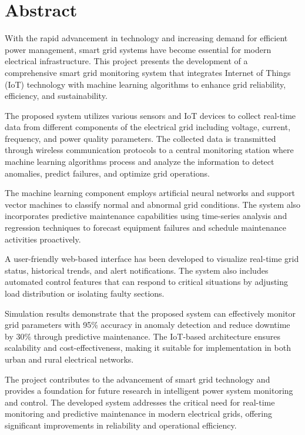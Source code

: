 

\chapter*{Abstract}
\thispagestyle{plain}

With the rapid advancement in technology and increasing demand for efficient power management, smart grid systems have become essential for modern electrical infrastructure. This project presents the development of a comprehensive smart grid monitoring system that integrates Internet of Things (IoT) technology with machine learning algorithms to enhance grid reliability, efficiency, and sustainability.

The proposed system utilizes various sensors and IoT devices to collect real-time data from different components of the electrical grid including voltage, current, frequency, and power quality parameters. The collected data is transmitted through wireless communication protocols to a central monitoring station where machine learning algorithms process and analyze the information to detect anomalies, predict failures, and optimize grid operations.

The machine learning component employs artificial neural networks and support vector machines to classify normal and abnormal grid conditions. The system also incorporates predictive maintenance capabilities using time-series analysis and regression techniques to forecast equipment failures and schedule maintenance activities proactively.

A user-friendly web-based interface has been developed to visualize real-time grid status, historical trends, and alert notifications. The system also includes automated control features that can respond to critical situations by adjusting load distribution or isolating faulty sections.

Simulation results demonstrate that the proposed system can effectively monitor grid parameters with 95\% accuracy in anomaly detection and reduce downtime by 30\% through predictive maintenance. The IoT-based architecture ensures scalability and cost-effectiveness, making it suitable for implementation in both urban and rural electrical networks.

The project contributes to the advancement of smart grid technology and provides a foundation for future research in intelligent power system monitoring and control. The developed system addresses the critical need for real-time monitoring and predictive maintenance in modern electrical grids, offering significant improvements in reliability and operational efficiency.

\cleardoublepage